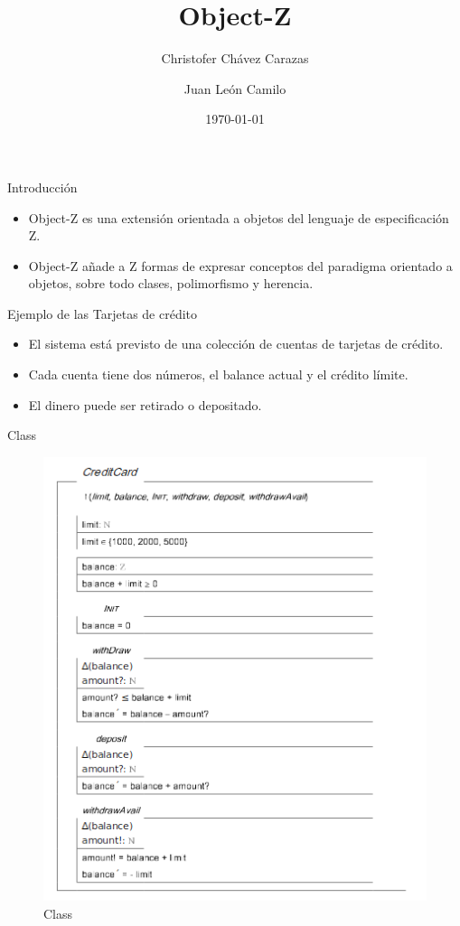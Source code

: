 \documentclass{beamer}
\title{Object-Z}
\author{Christofer Chávez Carazas \and Juan León Camilo}
\institute[Universidad Nacional de San Agustin] %
{
  Universidad Nacional de San Agustín
}
\date{\today}
\begin{document}
\maketitle

\begin{frame}{Introducción}
    \begin{itemize}
        \item Object-Z es una extensión orientada a objetos del lenguaje de especificación Z. 
        \item Object-Z añade a Z formas de expresar conceptos del paradigma orientado a objetos, sobre todo clases, polimorfismo y herencia.
    \end{itemize}
\end{frame}

\begin{frame}{Ejemplo de las Tarjetas de crédito}
  \begin{itemize}
      \item El sistema está previsto de una colección de cuentas de tarjetas de crédito.
      \item Cada cuenta tiene dos números, el balance actual y el crédito límite.
      \item El dinero puede ser retirado o depositado.
  \end{itemize}
\end{frame}

\begin{frame}{Class}
    \begin{figure}
        \centering
        \includegraphics[scale=0.3]{Z1.png}
        \caption{Class}
        \label{Clase CreditCard}
    \end{figure}
\end{frame}
\end{document}

